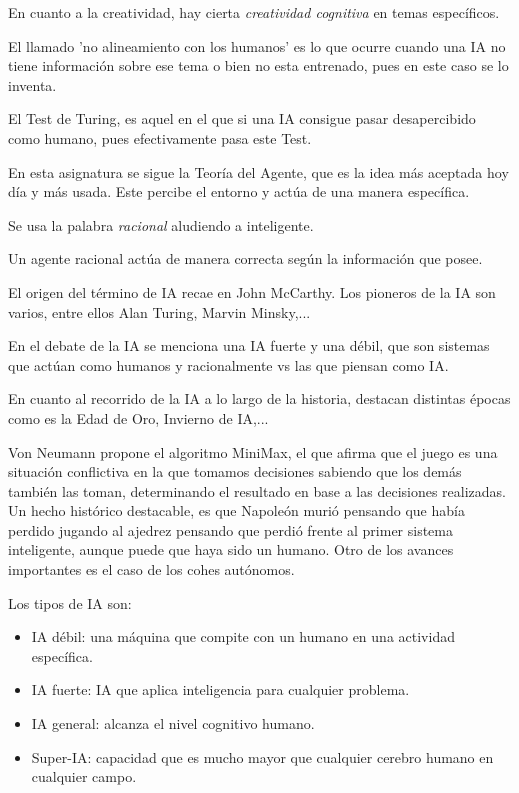 En cuanto a la creatividad, hay cierta\textit{ creatividad cognitiva }en temas específicos.

El llamado 'no alineamiento con los humanos' es lo que ocurre cuando una IA no tiene información sobre ese tema o bien no esta entrenado, pues en este caso se lo inventa.

El Test de Turing, es aquel en el que si una IA consigue pasar desapercibido como humano, pues efectivamente pasa este Test.

En esta asignatura se sigue la Teoría del Agente, que es la idea más aceptada hoy día y más usada. Este percibe el entorno y actúa de una manera específica. 

Se usa la palabra \textit{racional} aludiendo a inteligente.

Un agente racional actúa de manera correcta según la información que posee.

El origen del término de IA recae en John McCarthy. Los pioneros de la IA son varios, entre ellos Alan Turing, Marvin Minsky,...

En el debate de la IA se menciona una IA fuerte y una débil, que son sistemas que actúan como humanos y racionalmente vs las que piensan como IA.

En cuanto al recorrido de la IA a lo largo de la historia, destacan distintas épocas como es la Edad de Oro, Invierno de IA,...

Von Neumann propone el algoritmo MiniMax, el que afirma que el juego es una situación conflictiva en la que tomamos decisiones sabiendo que los demás también las toman, determinando el resultado en base a las decisiones realizadas.
Un hecho histórico destacable, es que Napoleón murió pensando que había perdido jugando al ajedrez pensando que perdió frente al primer sistema inteligente, aunque puede que haya sido un humano. 
Otro de los avances importantes es el caso de los cohes autónomos.

Los tipos de IA son:

\begin{itemize}
    \item IA débil: una máquina que compite con un humano en una actividad específica.
    \item IA fuerte: IA que aplica inteligencia para cualquier problema.
    \item IA general: alcanza el nivel cognitivo humano.
    \item Super-IA: capacidad que es mucho mayor que cualquier cerebro humano en cualquier campo.
\end{itemize}
